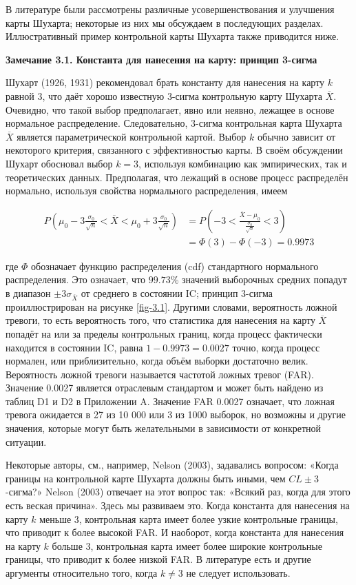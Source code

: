 В литературе были рассмотрены различные усовершенствования и улучшения карты Шухарта; некоторые из них мы обсуждаем в последующих разделах. Иллюстративный пример контрольной карты Шухарта также приводится ниже.

\noindent\textbf{Замечание 3.1. Константа для нанесения на карту: принцип 3-сигма}

Шухарт (1926, 1931) рекомендовал брать константу для нанесения на карту \(k\) равной 3, что даёт хорошо известную 3-сигма контрольную карту Шухарта \(\overline{X}\). Очевидно, что такой выбор предполагает, явно или неявно, лежащее в основе нормальное распределение. Следовательно, 3-сигма контрольная карта Шухарта \(\overline{X}\) является параметрической контрольной картой. Выбор \(k\) обычно зависит от некоторого критерия, связанного с эффективностью карты. В своём обсуждении Шухарт обосновал выбор \(k = 3\), используя комбинацию как эмпирических, так и теоретических данных. Предполагая, что лежащий в основе процесс распределён нормально, используя свойства нормального распределения, имеем

\[
\begin{aligned}
	P\left(\mu_0 - 3\frac{\sigma_0}{\sqrt{n}} < \overline{X} < \mu_0 + 3\frac{\sigma_0}{\sqrt{n}}\right) &= P\left(-3 < \frac{\overline{X} - \mu_0}{\frac{\sigma_0}{\sqrt{n}}} < 3\right) \\
	&= \Phi(3) - \Phi(-3) = 0.9973
\end{aligned}
\]

где \(\Phi\) обозначает функцию распределения (cdf) стандартного нормального распределения. Это означает, что \(99.73\%\) значений выборочных средних попадут в диапазон \(\pm 3\sigma_{\overline{X}}\) от среднего в состоянии IC; принцип 3-сигма проиллюстрирован на рисунке \ref{fig-3.1}. Другими словами, вероятность ложной тревоги, то есть вероятность того, что статистика для нанесения на карту \(\overline{X}\) попадёт на или за пределы контрольных границ, когда процесс фактически находится в состоянии IC, равна \(1 - 0.9973 = 0.0027\) точно, когда процесс нормален, или приблизительно, когда объём выборки достаточно велик. Вероятность ложной тревоги называется частотой ложных тревог (FAR). Значение 0.0027 является отраслевым стандартом и может быть найдено из таблиц D1 и D2 в Приложении A. Значение FAR 0.0027 означает, что ложная тревога ожидается в 27 из 10 000 или 3 из 1000 выборок, но возможны и другие значения, которые могут быть желательными в зависимости от конкретной ситуации.

Некоторые авторы, см., например, Nelson (2003), задавались вопросом: «Когда границы на контрольной карте Шухарта должны быть иными, чем \(CL \pm 3\)-сигма?» Nelson (2003) отвечает на этот вопрос так: «Всякий раз, когда для этого есть веская причина». Здесь мы развиваем это. Когда константа для нанесения на карту \(k\) меньше 3, контрольная карта имеет более узкие контрольные границы, что приводит к более высокой FAR. И наоборот, когда константа для нанесения на карту \(k\) больше 3, контрольная карта имеет более широкие контрольные границы, что приводит к более низкой FAR. В литературе есть и другие аргументы относительно того, когда \(k \neq 3\) не следует использовать.

